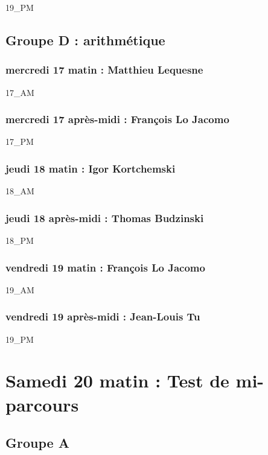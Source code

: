\documentclass[12pt,A4]{book}
\theoremstyle{definition}
\theoremstyle{thm}
\theoremstyle{def}
\begin{document}
{19_PM}

\section {Groupe D : arithmétique}

\subsection{mercredi 17 matin : Matthieu Lequesne}

{17_AM}

\subsection{mercredi 17 après-midi : François Lo Jacomo}

{17_PM}

\subsection{jeudi 18 matin : Igor Kortchemski}

{18_AM}

\subsection{jeudi 18 après-midi : Thomas Budzinski}

{18_PM}

\subsection{vendredi 19 matin : François Lo Jacomo}

{19_AM}

\subsection{vendredi 19 après-midi : Jean-Louis Tu}

{19_PM}

\fi

\chapter{Samedi 20 matin : Test de mi-parcours}
\minitoc \bigskip


\section{Groupe A}
\end{document}
